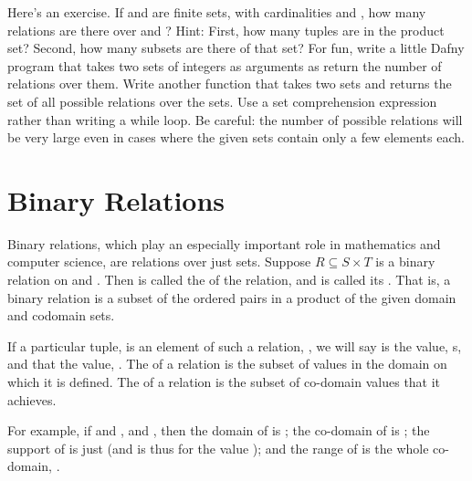 \documentclass[letterpaper,10pt,english]{sphinxmanual}
\begin{document}
Here’s an exercise. If  and  are finite sets, with cardinalities
 and , how many relations are there over  and
? Hint: First, how many tuples are in the product set? Second, how
many subsets are there of that set? For fun, write a little Dafny
program that takes two sets of integers as arguments as return the
number of relations over them.  Write another function that takes two
sets and returns the set of all possible relations over the sets. Use
a set comprehension expression rather than writing a while loop. Be
careful: the number of possible relations will be very large even in
cases where the given sets contain only a few elements each.


\section{Binary Relations}
\label{\detokenize{07-set-theory:binary-relations}}
Binary relations, which play an especially important role in
mathematics and computer science, are relations over just 
sets. Suppose \(R \subseteq S \times T\) is a binary relation on
 and . Then  is called the  of the relation, and 
is called its . That is, a binary relation is a subset of
the ordered pairs in a product of the given domain and codomain sets.

If a particular tuple,  is an element of such a relation, ,
we will say  is  the value, s, and that 
the value, . The  of a relation is the subset of values in
the domain on which it is defined. The  of a relation is the
subset of co-domain values that it achieves.

For example, if  and , and , then the domain of  is ; the
co-domain of  is ; the support of  is just  (and 
is thus  for the value ); and the range of  is
the whole co-domain, .
\end{document}

